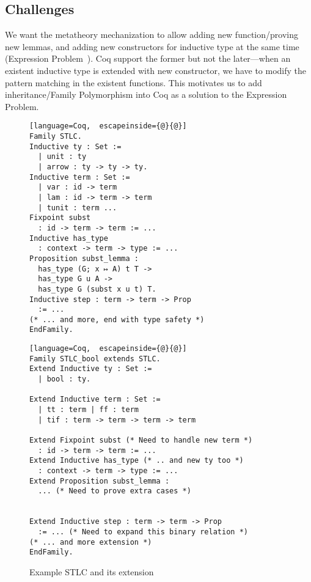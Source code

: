 \subsection{Challenges}

We want the metatheory mechanization to allow adding new
function/proving new lemmas, and adding new constructors for inductive
type at the same time  (Expression Problem~\cite{wadler-ep}). Coq
support the former but not the later---when an existent inductive type
is extended with new constructor, we have to modify the pattern matching
in the existent functions. This motivates us to add inheritance/Family
Polymorphism into Coq as a solution to the Expression Problem. 

\begin{figure}[!htb]
  \begin{minipage}[t]{0.47\linewidth}
\begin{lstlisting}[language=Coq,  escapeinside={@}{@}]
Family STLC.
Inductive ty : Set :=
  | unit : ty
  | arrow : ty -> ty -> ty.
Inductive term : Set := 
  | var : id -> term 
  | lam : id -> term -> term 
  | tunit : term ...
Fixpoint subst 
  : id -> term -> term := ...
Inductive has_type 
  : context -> term -> type := ...
Proposition subst_lemma :
  has_type (G; x ↦ A) t T ->
  has_type G u A ->
  has_type G (subst x u t) T.
Inductive step : term -> term -> Prop 
  := ...
(* ... and more, end with type safety *)
EndFamily.
\end{lstlisting}
  \end{minipage}
  \begin{minipage}[t]{0.47\linewidth}
\begin{lstlisting}[language=Coq,  escapeinside={@}{@}]
Family STLC_bool extends STLC.
Extend Inductive ty : Set :=
  | bool : ty.

Extend Inductive term : Set := 
  | tt : term | ff : term 
  | tif : term -> term -> term -> term

Extend Fixpoint subst (* Need to handle new term *)
  : id -> term -> term := ...
Extend Inductive has_type (* .. and new ty too *)
  : context -> term -> type := ...
Extend Proposition subst_lemma :
  ... (* Need to prove extra cases *)


Extend Inductive step : term -> term -> Prop 
  := ... (* Need to expand this binary relation *)
(* ... and more extension *)
EndFamily.
\end{lstlisting}
  \end{minipage}
  \caption{Example STLC and its extension}\label{fig:STLC-example}
\end{figure}

